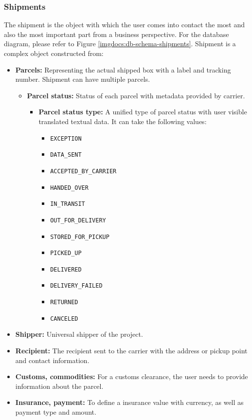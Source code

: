 \subsubsection{Shipments}
The shipment is the object with which the user comes into contact the most and also the most important part from a business perspective.
For the database diagram, please refer to Figure \ref{imgdocs:db-schema-shipments}.
Shipment is a complex object constructed from:
\begin{itemize}
    \item \textbf{Parcels:} Representing the actual shipped box with a label and tracking number. Shipment can have multiple parcels.
    \begin{itemize}
        \item \textbf{Parcel status:} Status of each parcel with metadata provided by carrier.
        \begin{itemize}
            \item \textbf{Parcel status type:} A unified type of parcel status with user visible translated textual data. It can take the following values:
            \begin{itemize}
                \item \texttt{EXCEPTION}
                \item \texttt{DATA\_SENT}
                \item \texttt{ACCEPTED\_BY\_CARRIER}
                \item \texttt{HANDED\_OVER}
                \item \texttt{IN\_TRANSIT}
                \item \texttt{OUT\_FOR\_DELIVERY}
                \item \texttt{STORED\_FOR\_PICKUP}
                \item \texttt{PICKED\_UP}
                \item \texttt{DELIVERED}
                \item \texttt{DELIVERY\_FAILED}
                \item \texttt{RETURNED}
                \item \texttt{CANCELED}
            \end{itemize}
        \end{itemize}
    \end{itemize}
    \item \textbf{Shipper:} Universal shipper of the project.
    \item \textbf{Recipient:} The recipient sent to the carrier with the address or pickup point and contact information.
    \item \textbf{Customs, commodities:} For a customs clearance, the user needs to provide information about the parcel.
    \item \textbf{Insurance, payment:} To define a insurance value with currency, as well as payment type and amount.
\end{itemize}

